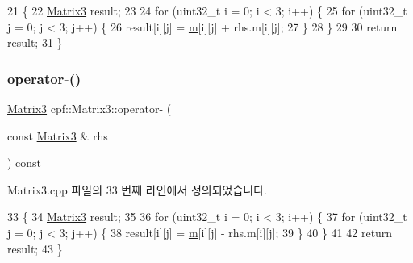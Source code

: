 \begin{DoxyCode}
21                                                         \{
22         \hyperlink{classcpf_1_1_matrix3_a449a9e860e87c053355379869430cbb7}{Matrix3} result;
23 
24         \textcolor{keywordflow}{for} (uint32\_t i = 0; i < 3; i++) \{
25             \textcolor{keywordflow}{for} (uint32\_t j = 0; j < 3; j++) \{
26                 result[i][j] = \hyperlink{classcpf_1_1_matrix3_a544955e219e5edd0c933f5e83dde9fac}{m}[i][j] + rhs.m[i][j];
27             \}
28         \}
29 
30         \textcolor{keywordflow}{return} result;
31     \}
\end{DoxyCode}
\mbox{\label{classcpf_1_1_matrix3_a3d1739da0e67b8c0106fbafbb7132153}} 
\subsubsection{\texorpdfstring{operator-\/()}{operator-()}\hspace{0.1cm}{\footnotesize\ttfamily [1/2]}}
{\footnotesize\ttfamily \hyperlink{classcpf_1_1_matrix3}{Matrix3} cpf\+::\+Matrix3\+::operator-\/ (\begin{DoxyParamCaption}\item[{const \hyperlink{classcpf_1_1_matrix3}{Matrix3} \&}]{rhs }\end{DoxyParamCaption}) const}



Matrix3.\+cpp 파일의 33 번째 라인에서 정의되었습니다.


\begin{DoxyCode}
33                                                         \{
34         \hyperlink{classcpf_1_1_matrix3_a449a9e860e87c053355379869430cbb7}{Matrix3} result;
35 
36         \textcolor{keywordflow}{for} (uint32\_t i = 0; i < 3; i++) \{
37             \textcolor{keywordflow}{for} (uint32\_t j = 0; j < 3; j++) \{
38                 result[i][j] = \hyperlink{classcpf_1_1_matrix3_a544955e219e5edd0c933f5e83dde9fac}{m}[i][j] - rhs.m[i][j];
39             \}
40         \}
41 
42         \textcolor{keywordflow}{return} result;
43     \}
\end{DoxyCode}
\mbox{\label{classcpf_1_1_matrix3_a781b93ac9fbc6dec65f643bd63682ce6}} 
